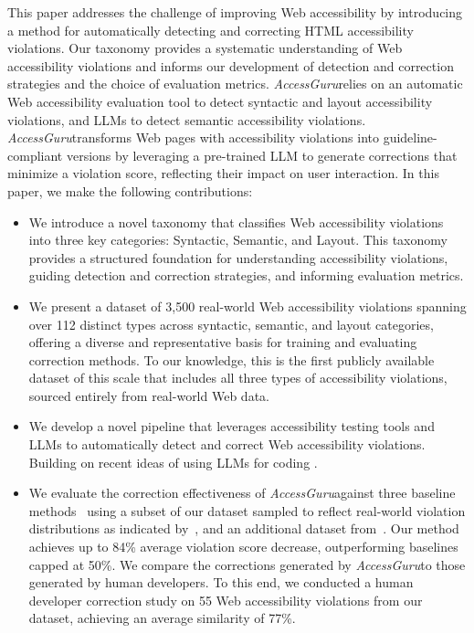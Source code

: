 \documentclass[sigconf, nonacm]{acmart}
\newcommand{\method}{\emph{AccessGuru}}
\begin{document}
This paper addresses the challenge of improving Web accessibility by introducing a method for automatically detecting and correcting HTML accessibility violations. Our taxonomy provides a systematic understanding of Web accessibility violations and informs our development of detection and correction strategies and the choice of evaluation metrics. \method \space relies on an automatic Web accessibility evaluation tool to detect syntactic and layout accessibility violations, and LLMs to detect semantic accessibility violations. \method \space transforms Web pages with accessibility violations into guideline-compliant versions by leveraging a pre-trained LLM to generate corrections that minimize a violation score, reflecting their impact on user interaction. In this paper, we make the following contributions: 
\begin{itemize} 
\item We introduce a novel taxonomy that classifies Web accessibility violations into three key categories: Syntactic, Semantic, and Layout. This taxonomy provides a structured foundation for understanding accessibility violations, guiding detection and correction strategies, and informing evaluation metrics.

\item  We present a dataset of 3,500 real-world Web accessibility violations spanning over 112 distinct types across syntactic, semantic, and layout categories, offering a diverse and representative basis for training and evaluating correction methods. To our knowledge, this is the first publicly available dataset of this scale that includes all three types of accessibility violations, sourced entirely from real-world Web data. 

\item We develop a novel pipeline that leverages accessibility testing tools and LLMs to automatically detect and correct Web accessibility violations. Building on recent ideas of using LLMs for coding \cite{DBLP:conf/icse/NamMHVM24, DBLP:conf/nips/LiuXW023, DBLP:conf/chi/Vaithilingam0G22, DBLP:conf/w4a/AljedaaniHAEF24, DBLP:journals/corr/abs-2107-03374, DBLP:journals/corr/abs-2108-07732, DBLP:conf/naacl/AhmadCRC21}.

\item We evaluate the correction effectiveness of \method \space against three baseline methods~\cite{DBLP:conf/petra/OthmanDJ23, DBLP:journals/corr/abs-2401-16450, DBLP:conf/ccnc/DelnevoAM24} using a subset of our dataset sampled to reflect real-world violation distributions as indicated by~\cite{Webaim2025}, and an additional dataset from~\cite{DBLP:journals/corr/abs-2401-16450}. Our method achieves up to 84\% average violation score decrease, outperforming baselines capped at 50\%. We compare the corrections generated by \method \space to those generated by human developers. To this end, we conducted a human developer correction study on 55 Web accessibility violations from our dataset, achieving an average similarity of 77\%.

\end{itemize}
\end{document}
